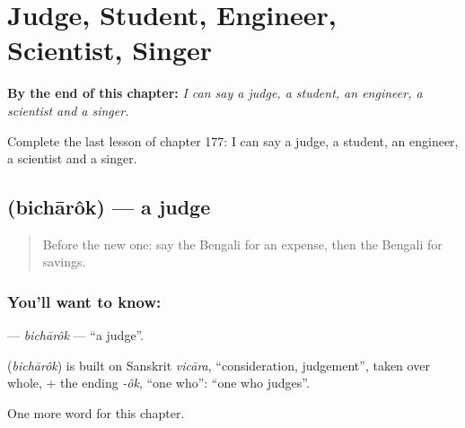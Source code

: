 
\chapter{Judge, Student, Engineer, Scientist, Singer}
\label{ch:bn-judge-student-engineer-scientist-singer}

\begin{chapteropening}
\textbf{By the end of this chapter:} \emph{I can say a judge, a student, an engineer, a scientist and a singer.}

Complete the last lesson of chapter 177: I can say a judge, a student, an engineer, a scientist and a singer.
\end{chapteropening}

\section[\texorpdfstring{\bn{বিচারক} (bichārôk)}{বিচারক (bichārôk)}]{ (bichārôk) — a judge}

\label{lesson:BN-C177-bicharok}



\begin{quote}
Before the new one: say the Bengali for an expense, then the Bengali for savings.
\end{quote}

\subsection*{You'll want to know: }
\textbf{} — \emph{bichārôk} — \textquotedblleft{}a judge\textquotedblright{}.

\begin{cousinweb}
\textbf{} (\emph{bichārôk}) is built on Sanskrit \emph{vicāra}, \textquotedblleft{}consideration, judgement\textquotedblright{}, taken over whole, + the ending \emph{-ôk}, \textquotedblleft{}one who\textquotedblright{}: \textquotedblleft{}one who judges\textquotedblright{}.
\end{cousinweb}

\begin{grammarlens}[title={What you've built}]
One more word for this chapter.
\end{grammarlens}

